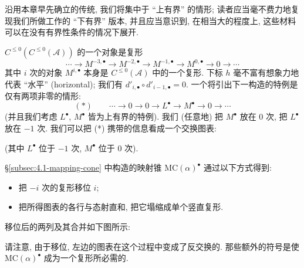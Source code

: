 沿用本章早先确立的传统, 我们将集中于 ``上有界'' 的情形; 读者应当毫不费力地复现我们所做工作的 ``下有界'' 版本, 并且应当意识到, 在相当大的程度上, 这些材料可以在没有有界性条件的情况下展开.

$C^{\le 0}(C^{\le 0}(\mathcal{A}))$ 的一个对象是复形
\[
\cdots \longrightarrow M^{-3,\bullet} \longrightarrow M^{-2,\bullet} \longrightarrow M^{-1,\bullet} \longrightarrow M^{0,\bullet} \longrightarrow 0 \longrightarrow \cdots
\]
其中 $i$ 次的对象 $M^{i,\bullet}$ 本身是 $C^{\le 0}(\mathcal{A})$ 中的一个复形. 下标 $h$ 毫不富有想象力地代表 ``水平'' (horizontal); 我们有 $d'_{i,\bullet}\circ d'_{i-1,\bullet}=0$. 一个将引出下一构造的特例是仅有两项非零的情形:
\[
(*)\qquad \cdots \longrightarrow 0 \longrightarrow 0 \longrightarrow L^\bullet \longrightarrow M^\bullet \longrightarrow 0 \longrightarrow \cdots
\]
(并且我们考虑 $L^\bullet$, $M^\bullet$ 皆为上有界的特例). 我们 (任意地) 把 $M^\bullet$ 放在 0 次, 把 $L^\bullet$ 放在 $-1$ 次. 我们可以把 (*) 携带的信息看成一个交换图表:

\begin{center}
\end{center}

\noindent (其中 $L^\bullet$ 位于 $-1$ 次, $M^\bullet$ 位于 $0$ 次).

\S\ref{subsec:4.1-mapping-cone} 中构造的映射锥 $\mathrm{MC}(\alpha)^\bullet$ 通过以下方式得到:
\begin{itemize}
\item 把 $-i$ 次的复形移位 $i$;
\item 把所得图表的各行与态射直和, 把它塌缩成单个竖直复形.
\end{itemize}

移位后的两列及其合并如下图所示:
\begin{center}
\qquad
{}
\end{center}
请注意, 由于移位, 左边的图表在这个过程中变成了反交换的. 那些额外的符号是使 $\mathrm{MC}(\alpha)^\bullet$ 成为一个复形所必需的.

